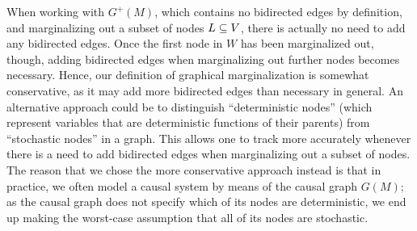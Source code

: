 \begin{Rem}
  When working with $G^+(M)$, which contains no bidirected edges by definition, and marginalizing out a subset of nodes $L \subseteq V$, there is actually no need to add any bidirected edges.
  Once the first node in $W$ has been marginalized out, though, adding bidirected edges when marginalizing out further nodes becomes necessary.
  Hence, our definition of graphical marginalization is somewhat conservative, as it may add more bidirected edges than necessary in general.
  An alternative approach could be to distinguish ``deterministic nodes'' (which represent variables that are deterministic functions of their parents) from ``stochastic nodes'' in a graph.
  This allows one to track more accurately whenever there is a need to add bidirected edges when marginalizing out a subset of nodes.
  The reason that we chose the more conservative approach instead is that in practice, we often model a causal system by means of the causal graph $G(M)$; as the causal graph does not specify which of its nodes are deterministic, we end up making the worst-case assumption that all of its nodes are stochastic.
\end{Rem}

